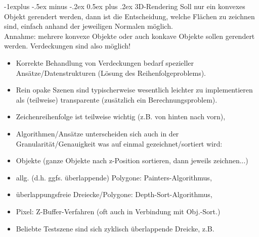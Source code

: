 \documentclass[10pt,landscape]{article}
\makeatletter
\renewcommand{\subsection}{\@startsection{subsection}{2}{0mm}%
                                {-1explus -.5ex minus -.2ex}%
                                {0.5ex plus .2ex}%
                                {\normalfont\normalsize\bfseries}}
\makeatother
\begin{document}
\begin{multicols}{3}
\subsection{ 3D-Rendering}
Soll nur ein konvexes Objekt gerendert werden, dann ist die Entscheidung, welche Flächen zu zeichnen sind, einfach anhand der jeweiligen Normalen möglich.\\
Annahme: mehrere konvexe Objekte oder auch konkave Objekte sollen gerendert werden. Verdeckungen sind also möglich!
\begin{itemize}
  \item Korrekte Behandlung von Verdeckungen bedarf spezieller Ansätze/Datenstrukturen (Lösung des Reihenfolgeproblems).
  \item Rein opake Szenen sind typischerweise wesentlich leichter zu implementieren als (teilweise) transparente (zusätzlich ein Berechnungsproblem).
  \item Zeichenreihenfolge ist teilweise wichtig (z.B. von hinten nach vorn),
  \item Algorithmen/Ansätze unterscheiden sich auch in der Granularität/Genauigkeit was auf einmal gezeichnet/sortiert wird:
  \item Objekte (ganze Objekte nach z-Position sortieren, dann jeweils zeichnen...)
  \item allg. (d.h. ggfs. überlappende) Polygone: Painters-Algorithmus,
  \item überlappungsfreie Dreiecke/Polygone: Depth-Sort-Algorithmus,
  \item Pixel: Z-Buffer-Verfahren (oft auch in Verbindung mit Obj.-Sort.)
  \item Beliebte Testszene sind sich zyklisch überlappende Dreicke, z.B.
\end{itemize}


\end{multicols}
\end{document}
